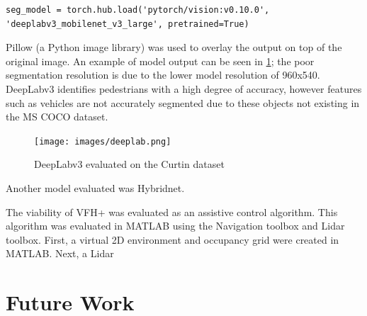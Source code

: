 \documentclass[12pt]{article}
\begin{document}
\begin{verbatim}
seg_model = torch.hub.load('pytorch/vision:v0.10.0', 'deeplabv3_mobilenet_v3_large', pretrained=True)
\end{verbatim}

Pillow (a Python image library) was used to overlay the output on top of the original image.
An example of model output can be seen in \cref{fig:deeplab}; the poor segmentation resolution is due to the
lower model resolution of 960x540. DeepLabv3 identifies pedestrians with a high degree of accuracy, however
features such as vehicles are not accurately segmented due to these objects not existing in the MS COCO dataset.

\begin{figure}[H]
    \centering
    \texttt{[image: images/deeplab.png]}
    \caption{DeepLabv3 evaluated on the Curtin dataset}
    \label{fig:deeplab}
\end{figure}

Another model evaluated was Hybridnet.

The viability of VFH+ was evaluated as an assistive control algorithm. This algorithm was evaluated
in MATLAB using the Navigation toolbox and Lidar toolbox.
First, a virtual 2D environment and occupancy grid were created in MATLAB.
Next, a Lidar 


\pagebreak





\section{Future Work}

\pagebreak





\printbibliography[heading=bibnumbered]
\end{document}
